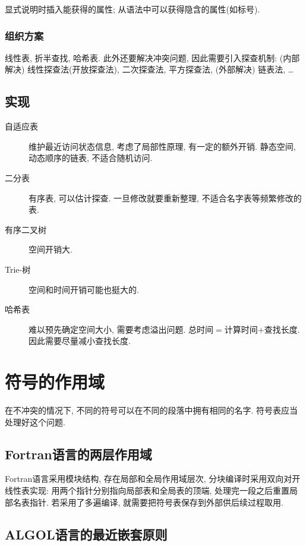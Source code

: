                 显式说明时插入能获得的属性; 从语法中可以获得隐含的属性(如标号). 

            \subsubsection{组织方案} 
            
                线性表, 折半查找, 哈希表. 此外还要解决冲突问题, 因此需要引入探查机制: (内部解决) 线性探查法(开放探查法), 二次探查法, 平方探查法, (外部解决) 链表法, \ldots

        \subsection{实现}

            \begin{description}
                \item[自适应表] 维护最近访问状态信息, 考虑了局部性原理, 有一定的额外开销. 静态空间, 动态顺序的链表, 不适合随机访问.
                \item[二分表] 有序表, 可以估计探查. 一旦修改就要重新整理, 不适合名字表等频繁修改的表.
                \item[有序二叉树] 空间开销大.
                \item[Trie-树] 空间和时间开销可能也挺大的.
                \item[哈希表] 难以预先确定空间大小, 需要考虑溢出问题. 总时间$=$计算时间$+$查找长度. 因此需要尽量减小查找长度.
            \end{description}

    \section{符号的作用域}

        在不冲突的情况下, 不同的符号可以在不同的段落中拥有相同的名字. 符号表应当处理好这个问题.

        \subsection{Fortran语言的两层作用域}

            Fortran语言采用模块结构, 存在局部和全局作用域层次, 分块编译时采用双向对开线性表实现: 用两个指针分别指向局部表和全局表的顶端, 处理完一段之后重置局部名表指针. 若采用了多遍编译, 就需要把符号表保存到外部供后续过程取用.

        \subsection{ALGOL语言的最近嵌套原则}

